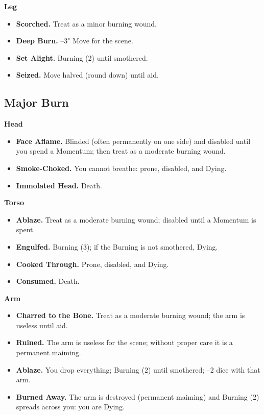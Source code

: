 \textbf{Leg}
\begin{itemize}
    \item[1] \textbf{Scorched.} Treat as a minor burning wound.
    \item[2] \textbf{Deep Burn.} --3" Move for the scene.
    \item[3] \textbf{Set Alight.} Burning (2) until smothered.
    \item[4] \textbf{Seized.} Move halved (round down) until aid.
\end{itemize}

\subsection{Major Burn}

\textbf{Head}
\begin{itemize}
    \item[1] \textbf{Face Aflame.} Blinded (often permanently on one side) and disabled until you spend a Momentum; then treat as a moderate burning wound.
    \item[2] \textbf{Smoke-Choked.} You cannot breathe: prone, disabled, and Dying.
    \item[3--4] \textbf{Immolated Head.} Death.
\end{itemize}

\textbf{Torso}
\begin{itemize}
    \item[1] \textbf{Ablaze.} Treat as a moderate burning wound; disabled until a Momentum is spent.
    \item[2] \textbf{Engulfed.} Burning (3); if the Burning is not smothered, Dying.
    \item[3] \textbf{Cooked Through.} Prone, disabled, and Dying.
    \item[4] \textbf{Consumed.} Death.
\end{itemize}

\textbf{Arm}
\begin{itemize}
    \item[1] \textbf{Charred to the Bone.} Treat as a moderate burning wound; the arm is useless until aid.
    \item[2] \textbf{Ruined.} The arm is useless for the scene; without proper care it is a permanent maiming.
    \item[3] \textbf{Ablaze.} You drop everything; Burning (2) until smothered; --2 dice with that arm.
    \item[4] \textbf{Burned Away.} The arm is destroyed (permanent maiming) and Burning (2) spreads across you: you are Dying.
\end{itemize}

